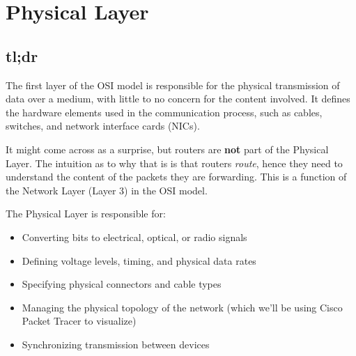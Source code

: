 \chapter{Physical Layer}\label{sec:osi_physical}
\section{tl;dr}
The first layer of the OSI model is responsible for the physical transmission of data over a medium, with little to no concern for the content involved. It defines the hardware elements used in the communication process, such as cables, switches, and network interface cards (NICs).

\begin{noteblock}
    It might come across as a surprise, but routers are \textbf{not} part of the Physical Layer. The intuition as to why that is is that routers \textit{route}, hence they need to understand the content of the packets they are forwarding. This is a function of the Network Layer (Layer 3) in the OSI model.
\end{noteblock}

The Physical Layer is responsible for:
\begin{itemize}
    \item Converting bits to electrical, optical, or radio signals
    \item Defining voltage levels, timing, and physical data rates
    \item Specifying physical connectors and cable types
    \item Managing the physical topology of the network (which we'll be using Cisco Packet Tracer to visualize)
    \item Synchronizing transmission between devices
\end{itemize}

\newpage




